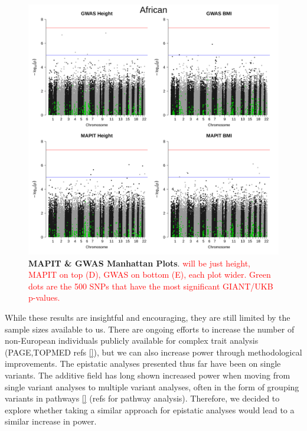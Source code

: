 \documentclass[12pt, a4paper]{article}
\begin{document}
\begin{figure}[htbp]
\centering
\includegraphics[scale=.35]{Images/Main/InterPath_Main_Figure_MAPITvsGWAS_Manhattan_vs1.png}
\caption[TBD]{\textbf{MAPIT \& GWAS Manhattan Plots}. \textcolor{red}{will be just height, MAPIT on top (D), GWAS on bottom (E), each plot wider. Green dots are the 500 SNPs that have the most significant GIANT/UKB p-values.}}
\label{InterPath-Main-Figure-MAPITvsGWAS-Manhattan}
\end{figure}


While these results are insightful and encouraging, they are still limited by the sample sizes available to us. There are ongoing efforts to increase the number of non-European individuals publicly available for complex trait analysis (PAGE,TOPMED refs \ref{}), but we can also increase power through methodological improvements. The epistatic analyses presented thus far have been on single variants. The additive field has long shown increased power when moving from single variant analyses to multiple variant analyses, often in the form of grouping variants in pathways \ref{} (refs for pathway analysis). Therefore, we decided to explore whether taking a similar approach for epistatic analyses would lead to a similar increase in power.
\end{document}

